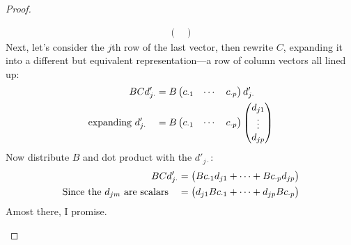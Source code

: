 \documentclass[12pt]{article}
\theoremstyle{plain}
\theoremstyle{definition}
\theoremstyle{remark}
\begin{document}
\begin{proof}
\begin{enumerate}[label=(\roman*)]
\begin{align}
\begin{pmatrix}
      \end{pmatrix} \label{bigz}
    \end{align}
    Next, let's consider the $j$th row of the last vector, then
    rewrite $C$, expanding it into a different but equivalent
    representation---a row of column vectors all lined up:
    \begin{align*}
        BCd'_{j\cdot} &= B
      \begin{pmatrix} c_{\cdot 1} & \cdots & c_{\cdot p}
      \end{pmatrix} d'_{j \cdot} \notag \\
        \text{expanding $d'_{j \cdot}$} \quad
      &= B
      \begin{pmatrix} c_{\cdot 1} & \cdots & c_{\cdot p}
      \end{pmatrix}
      \begin{pmatrix} d_{j 1} \\ \vdots \\ d_{j p}
      \end{pmatrix}
    \end{align*}
    Now distribute $B$ and dot product with the $d'_{j\cdot}$:
    \begin{align}
        BCd'_{j\cdot} &=
      \begin{pmatrix} Bc_{\cdot 1} d_{j 1} + \cdots
          + Bc_{\cdot p} d_{j p}
      \end{pmatrix}   \notag \\
        \text{Since the $d_{jm}$ are scalars} \quad &=
      \begin{pmatrix}  d_{j 1} Bc_{\cdot 1} + \cdots
          +  d_{j p}Bc_{\cdot p}
      \end{pmatrix}   \notag
    \end{align}
    Amost there, I promise.


\end{enumerate}
\end{proof}
\end{document}
